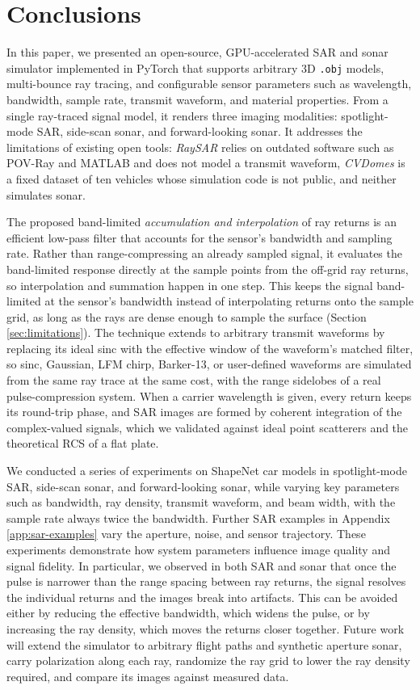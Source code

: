 \documentclass[sensors,article,submit,moreauthors]{Definitions/mdpi}
\begin{document}
\section{Conclusions}
\label{sec:conclusion}
In this paper, we presented an open-source, GPU-accelerated SAR and sonar
simulator implemented
in PyTorch that supports arbitrary 3D \texttt{.obj} models, multi-bounce ray
tracing, and
configurable sensor parameters such as wavelength, bandwidth, sample rate,
transmit waveform, and
material properties. From a single ray-traced signal model, it renders three
imaging modalities:
spotlight-mode SAR, side-scan sonar, and forward-looking sonar. It addresses the
limitations of existing open tools: \emph{RaySAR} relies on outdated software
such as POV-Ray and
MATLAB and does not model a transmit waveform, \emph{CVDomes} is a fixed dataset
of ten vehicles
whose simulation code is not public, and
neither simulates sonar.

The proposed band-limited \emph{accumulation and interpolation} of ray returns
is an efficient
low-pass filter that accounts for the sensor's bandwidth and sampling
rate. Rather than range-compressing an already sampled signal, it evaluates the
band-limited
response directly at the sample points from the off-grid ray returns, so
interpolation and summation
happen in one step. This keeps the signal band-limited at the sensor's bandwidth
instead of
interpolating returns onto the sample grid, as long as the rays are dense enough
to sample the
surface (Section \ref{sec:limitations}). The technique extends to arbitrary
transmit waveforms
by replacing its ideal sinc with the effective window of the waveform's matched
filter, so sinc,
Gaussian, LFM chirp, Barker-13, or user-defined waveforms are simulated from the
same ray trace at
the same cost, with the range sidelobes of a real pulse-compression system. When
a carrier wavelength is given,
every return keeps its round-trip phase, and SAR images are formed by coherent
integration of the
complex-valued signals, which we validated against ideal point scatterers and
the theoretical
RCS of a flat plate.

We conducted a series of experiments on ShapeNet car models in spotlight-mode
SAR, side-scan
sonar, and forward-looking sonar, while varying key parameters such as
bandwidth, ray density,
transmit waveform, and beam width, with the sample rate always twice the
bandwidth. Further SAR
examples in Appendix \ref{app:sar-examples} vary the aperture, noise, and sensor
trajectory. These experiments demonstrate how system
parameters influence image quality and signal fidelity. In particular, we
observed in both SAR and
sonar that once the pulse is narrower than the range spacing between ray
returns, the signal
resolves the individual returns and the images break into artifacts. This can be
avoided either by
reducing the effective bandwidth, which widens the pulse, or by increasing the
ray density, which
moves the returns closer together.
Future work will extend the simulator to arbitrary flight paths and synthetic
aperture sonar, carry
polarization along each ray, randomize the ray grid to lower the ray density
required, and compare
its images against measured data.
\end{document}
